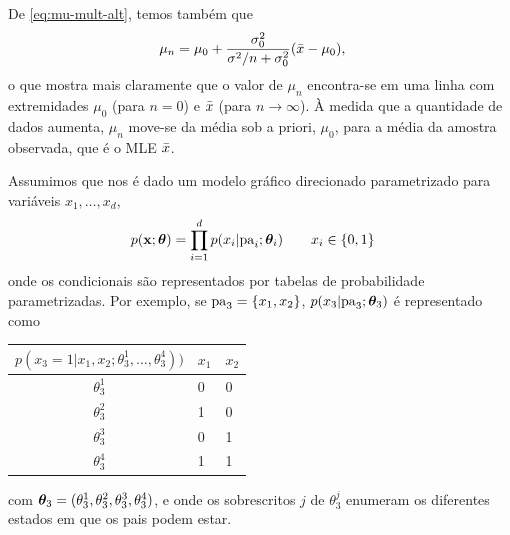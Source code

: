 \begin{solution}
    De \eqref{eq:mu-mult-alt}, temos tamb\'em que
    \begin{align}
        \mu_n & = \mu_0 + \frac{\sigma_0^2}{\sigma^2/n+\sigma_0^2}(\bar{x}-\mu_0),
    \end{align}
    o que mostra mais claramente que o valor de $\mu_n$ encontra-se em uma linha com extremidades $\mu_0$ (para $n = 0$) e $\bar{x}$ (para $n \to \infty$). \`A medida que
    a quantidade de dados aumenta, $\mu_n$ move-se da m\'edia sob a priori, $\mu_0$, para a m\'edia da amostra observada, que \'e o MLE $\bar{x}$.
\end{solution}



\label{ex:MLE-DGM-alt}
Assumimos que nos \'e dado um modelo gr\'afico direcionado parametrizado para vari\'aveis
$x_1, \ldots, x_d$, 
\begin{align}
    p(\mathbf{x}; \boldsymbol{\theta}) &= \prod_{i=1}^d p(x_i | \mathrm{pa}_i; \boldsymbol{\theta}_i) \quad \quad x_i \in \{0,1\} \label{eq:p-dag-alt}
\end{align}
onde os condicionais s\~ao representados por tabelas de probabilidade parametrizadas. Por exemplo, se $\mathrm{pa}_3 = \{x_1, x_2\}$, $p(x_3 | \mathrm{pa}_3; \boldsymbol{\theta}_3)$ \'e representado como

\begin{center}
    \begin{tabular}{@{}cll@{}}
        \toprule
        $p(x_3=1 | x_1, x_2; \theta^1_3, \ldots, \theta_3^4))$ & $x_1$ & $x_2$\\
        \midrule
        $\theta^1_3$ & 0 & 0\\
        $\theta^2_3$ & 1 & 0\\
        $\theta^3_3$ & 0 & 1\\
        $\theta^4_3$ & 1 & 1\\
        \bottomrule
    \end{tabular}
\end{center}
com $\boldsymbol{\theta}_3 = (\theta_3^1,\theta_3^2, \theta_3^3, \theta_3^4)$,
e onde os sobrescritos $j$ de $\theta_3^j$ enumeram os diferentes estados
em que os pais podem estar.

